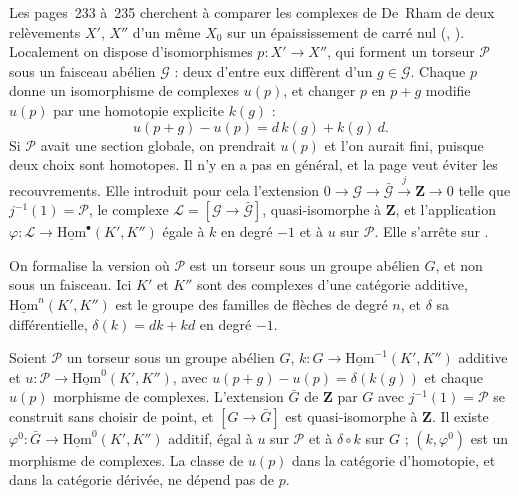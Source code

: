 Les pages~233 à~235 cherchent à comparer les complexes de De~Rham de deux relèvements $X'$, $X''$ d'un même $X_0$ sur un épaississement de carré nul (, ). Localement on dispose d'isomorphismes $p : X' \to X''$, qui forment un torseur $\mathcal P$ sous un faisceau abélien $\mathcal G$ : deux d'entre eux diffèrent d'un $g \in \mathcal G$. Chaque $p$ donne un isomorphisme de complexes $u(p)$, et changer $p$ en $p + g$ modifie $u(p)$ par une homotopie explicite $k(g)$ :
\[
u(p + g) - u(p) = d\,k(g) + k(g)\,d .
\]
Si $\mathcal P$ avait une section globale, on prendrait $u(p)$ et l'on aurait fini, puisque deux choix sont homotopes. Il n'y en a pas en général, et la page veut éviter les recouvrements. Elle introduit pour cela l'extension $0 \to \mathcal G \to \bar{\mathcal G} \xrightarrow{j} \mathbf Z \to 0$ telle que $j^{-1}(1) = \mathcal P$, le complexe $\mathcal L = [\mathcal G \to \bar{\mathcal G}]$, quasi-isomorphe à $\mathbf Z$, et l'application $\varphi : \mathcal L \to \underline{\mathrm{Hom}}^\bullet(K', K'')$ égale à $k$ en degré $-1$ et à $u$ sur $\mathcal P$. Elle s'arrête sur .

On formalise la version où $\mathcal P$ est un torseur sous un groupe abélien $G$, et non sous un faisceau. Ici $K'$ et $K''$ sont des complexes d'une catégorie additive, $\underline{\mathrm{Hom}}^n(K', K'')$ est le groupe des familles de flèches de degré $n$, et $\delta$ sa différentielle, $\delta(k) = dk + kd$ en degré $-1$.

\begin{encadre}
\begin{theoreme}
Soient $\mathcal P$ un torseur sous un groupe abélien $G$, $k : G \to \underline{\mathrm{Hom}}^{-1}(K', K'')$ additive et $u : \mathcal P \to \underline{\mathrm{Hom}}^0(K', K'')$, avec $u(p + g) - u(p) = \delta(k(g))$ et chaque $u(p)$ morphisme de complexes. L'extension $\bar G$ de $\mathbf Z$ par $G$ avec $j^{-1}(1) = \mathcal P$ se construit sans choisir de point, et $[G \to \bar G]$ est quasi-isomorphe à $\mathbf Z$. Il existe $\varphi^0 : \bar G \to \underline{\mathrm{Hom}}^0(K', K'')$ additif, égal à $u$ sur $\mathcal P$ et à $\delta \circ k$ sur $G$ ; $(k, \varphi^0)$ est un morphisme de complexes. La classe de $u(p)$ dans la catégorie d'homotopie, et dans la catégorie dérivée, ne dépend pas de $p$.
\end{theoreme}
\end{encadre}

